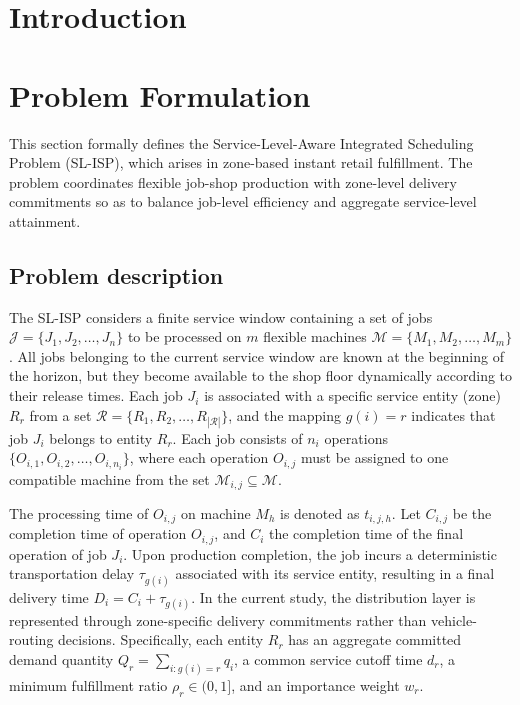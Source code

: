 \documentclass[a4paper,fleqn]{cas-sc}
\begin{document}
\maketitle
\section{Introduction}

\section{Problem Formulation}
\label{sec:problem_formulation}

This section formally defines the Service-Level-Aware Integrated Scheduling Problem (SL-ISP), which arises in zone-based instant retail fulfillment. The problem coordinates flexible job-shop production with zone-level delivery commitments so as to balance job-level efficiency and aggregate service-level attainment.

\subsection{Problem description}
The SL-ISP considers a finite service window containing a set of jobs $\mathcal{J} = \{J_1, J_2, \dots, J_n\}$ to be processed on $m$ flexible machines $\mathcal{M} = \{M_1, M_2, \dots, M_m\}$. All jobs belonging to the current service window are known at the beginning of the horizon, but they become available to the shop floor dynamically according to their release times. Each job $J_i$ is associated with a specific service entity (zone) $R_r$ from a set $\mathcal{R} = \{R_1, R_2, \dots, R_{|\mathcal{R}|}\}$, and the mapping $g(i)=r$ indicates that job $J_i$ belongs to entity $R_r$. Each job consists of $n_i$ operations $\{O_{i,1}, O_{i,2}, \dots, O_{i,n_i}\}$, where each operation $O_{i,j}$ must be assigned to one compatible machine from the set $\mathcal{M}_{i,j} \subseteq \mathcal{M}$.

The processing time of $O_{i,j}$ on machine $M_h$ is denoted as $t_{i,j,h}$. Let $C_{i,j}$ be the completion time of operation $O_{i,j}$, and $C_i$ the completion time of the final operation of job $J_i$. Upon production completion, the job incurs a deterministic transportation delay $\tau_{g(i)}$ associated with its service entity, resulting in a final delivery time $D_i = C_i + \tau_{g(i)}$. In the current study, the distribution layer is represented through zone-specific delivery commitments rather than vehicle-routing decisions. Specifically, each entity $R_r$ has an aggregate committed demand quantity $Q_r = \sum_{i:g(i)=r} q_i$, a common service cutoff time $d_r$, a minimum fulfillment ratio $\rho_r \in (0,1]$, and an importance weight $w_r$.
\end{document}
